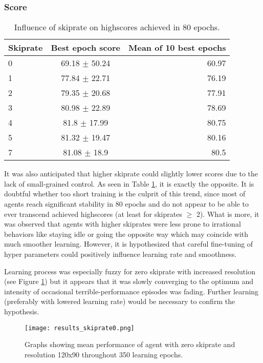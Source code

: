 		\subsubsection*{Score}
			\begin{table}
				\begin{center}
					\begin{tabular}{ |l || c | r |}
						\hline
						Skiprate & Best epoch score & Mean of 10 best epochs \\ \hline
						0 & 69.18 $\pm$ 50.24 & 60.97 \\ \hline
						1 & 77.84 $\pm$ 22.71 & 76.19 \\ \hline
						2 & 79.35 $\pm$ 20.68 & 77.91 \\ \hline
						3 & 80.98 $\pm$ 22.89 & 78.69 \\ \hline
						4 & 81.8 $\pm$ 17.99 & 80.75 \\ \hline
						5 & 81.32 $\pm$ 19.47 & 80.16 \\ \hline
						7 & 81.08 $\pm$ 18.9 & 80.5 \\ \hline
					\end{tabular}
				\end{center}
				\caption{Influence of skiprate on highscores achieved in 80 epochs.}\label{tab:results}
			\end{table}
			It was also anticipated that higher skiprate could slightly lower scores due to the lack of small-grained control. As seen in Table \ref{tab:results}, it is exactly the opposite. It is doubtful whether too short training is the culprit of this trend, since most of agents reach significant stability in 80 epochs and do not appear to be able to ever transcend achieved highscores (at least for skiprates $\geq$ 2). What is more, it was observed that agents with higher skiprates were less prone to irrational behaviors like staying idle or going the opposite way which may coincide with much smoother learning. However, it is hypothesized that careful fine-tuning of hyper parameters could positively influence learning rate and smoothness. 

			Learning process was especially fuzzy for zero skiprate with increased resolution (see Figure \ref{fig:results_skiprate0}) but it appears that it was slowly converging to the optimum and intensity of occasional terrible-performance episodes was fading. Further learning (preferably with lowered learning rate) would be necessary to confirm the hypothesis.
	
	\begin{figure}
		\centering
		\texttt{[image: results\_skiprate0.png]}
		\caption{Graphs showing mean performance of agent with zero skiprate and resolution 120x90 throughout 350 learning epochs.}\label{fig:results_skiprate0}
	\end{figure}

	
